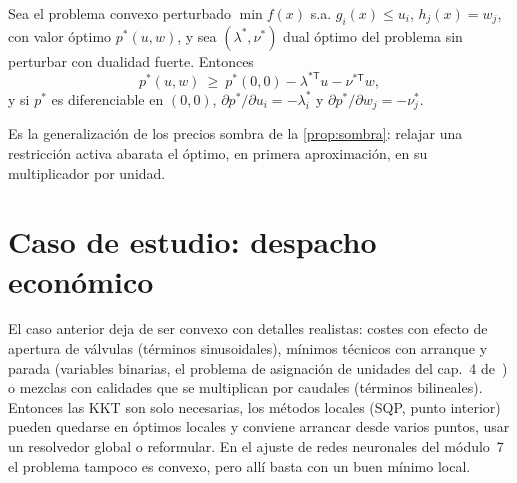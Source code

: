 \begin{proposicion}\label{prop:sensibilidad}
Sea el problema convexo perturbado $\min f(x)$ s.a. $g_i(x)\le u_i$, $h_j(x)=w_j$, con valor óptimo $p^{*}(u,w)$, y sea $(\lambda^{*},\nu^{*})$ dual óptimo del problema sin perturbar con dualidad fuerte. Entonces
\[
p^{*}(u,w)\ \ge\ p^{*}(0,0)-\lambda^{*\mathsf{T}}u-\nu^{*\mathsf{T}}w ,
\]
y si $p^{*}$ es diferenciable en $(0,0)$, $\partial p^{*}/\partial u_i=-\lambda_i^{*}$ y $\partial p^{*}/\partial w_j=-\nu_j^{*}$.
\end{proposicion}

Es la generalización de los precios sombra de la \cref{prop:sombra}: relajar una restricción activa abarata el óptimo, en primera aproximación, en su multiplicador por unidad.

\section{Caso de estudio: despacho económico}

\addtocounter{definicion}{1}%

\begin{observacion}\label{obs:noconvexo}
El caso anterior deja de ser convexo con detalles realistas: costes con efecto de apertura de válvulas (términos sinusoidales), mínimos técnicos con arranque y parada (variables binarias, el problema de asignación de unidades del cap.~4 de~\cite{wood}) o mezclas con calidades que se multiplican por caudales (términos bilineales). Entonces las KKT son solo necesarias, los métodos locales (SQP, punto interior) pueden quedarse en óptimos locales y conviene arrancar desde varios puntos, usar un resolvedor global o reformular. En el ajuste de redes neuronales del módulo~7 el problema tampoco es convexo, pero allí basta con un buen mínimo local.
\end{observacion}


